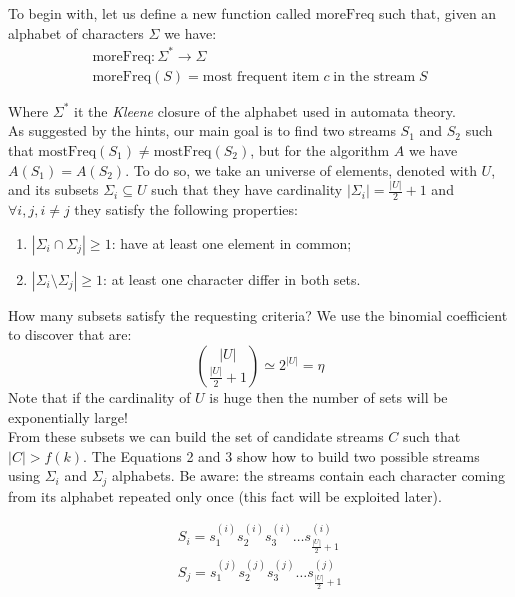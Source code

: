 \documentclass{article}
\begin{document}
To begin with, let us define a new function called $\textrm{moreFreq}$ such that, given an alphabet of characters $\Sigma$ we have:
\begin{gather*}
    \textrm{moreFreq}: \Sigma^{*} \to \Sigma \\
    \textrm{moreFreq}(S) = \textrm{most frequent item} \; c \; \textrm{in the stream} \; S
\end{gather*}

\noindent Where $\Sigma^{*}$ it the \textit{Kleene} closure of the alphabet used in automata theory.\\

\noindent As suggested by the hints, our main goal is to find two streams $S_1$ and $S_2$ such that $\textrm{mostFreq}(S_1) \ne \textrm{mostFreq}(S_2)$, 
but for the algorithm $A$ we have $A(S_1) = A(S_2)$. To do so, we take an universe of elements, denoted with $U$, and its subsets $\Sigma_i \subseteq U$ such
that they have cardinality $|\Sigma_i| = \frac{|U|}{2} + 1$ and $\forall i, j, i \ne j$ they satisfy the following properties:
\begin{enumerate}
    \item $|\Sigma_i \cap \Sigma_j| \ge 1$: have at least one element in common;
    \item $|\Sigma_i \setminus \Sigma_j| \ge 1$: at least one character differ in both sets.
\end{enumerate}

\noindent How many subsets satisfy the requesting criteria? We use the binomial coefficient to discover that are:
\begin{equation}
    \binom{|U|}{\frac{|U|}{2} + 1} \simeq 2^{|U|} = \eta
\end{equation}
Note that if the cardinality of $U$ is huge then the number of sets will be exponentially large!\\

\noindent From these subsets we can build the set of candidate streams $C$ such that $|C| > f(k)$. The Equations 2 and 3 show how to build
two possible streams using $\Sigma_i$ and $\Sigma_j$ alphabets. Be aware: the streams contain each character coming from its alphabet repeated
only once (this fact will be exploited later).

\begin{align}
    S_i = s_1^{(i)}s_2^{(i)}s_3^{(i)} \dots s_{\frac{|U|}{2} + 1}^{(i)} \\
    S_j = s_1^{(j)}s_2^{(j)}s_3^{(j)} \dots s_{\frac{|U|}{2} + 1}^{(j)}
\end{align}
\end{document}
